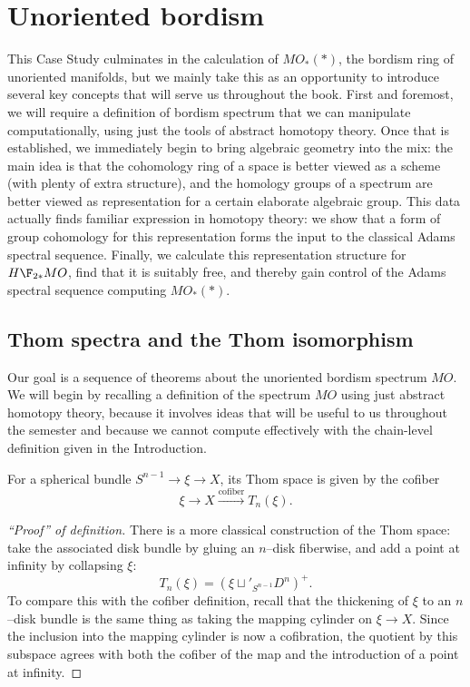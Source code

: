 
\chapter{Unoriented bordism}\label{UnorientedBordismChapter}




This Case Study culminates in the calculation of $MO_*(*)$, the bordism ring of unoriented manifolds, but we mainly take this as an opportunity to introduce several key concepts that will serve us throughout the book.  First and foremost, we will require a definition of bordism spectrum that we can manipulate computationally, using just the tools of abstract homotopy theory.  Once that is established, we immediately begin to bring algebraic geometry into the mix: the main idea is that the cohomology ring of a space is better viewed as a scheme (with plenty of extra structure), and the homology groups of a spectrum are better viewed as representation for a certain elaborate algebraic group.  This data actually finds familiar expression in homotopy theory: we show that a form of group cohomology for this representation forms the input to the classical Adams spectral sequence.  Finally, we calculate this representation structure for $H\F_{2*} MO$, find that it is suitably free, and thereby gain control of the Adams spectral sequence computing $MO_*(*)$.






\section{Thom spectra and the Thom isomorphism}\label{LectureThomSpectra}

Our goal is a sequence of theorems about the unoriented bordism spectrum $MO$.  We will begin by recalling a definition of the spectrum $MO$ using just abstract homotopy theory, because it involves ideas that will be useful to us throughout the semester and because we cannot compute effectively with the chain-level definition given in the Introduction.

\begin{definition}
For a spherical bundle $S^{n-1} \to \xi \to X$, its Thom space is given by the cofiber \[\xi \to X \xrightarrow{\text{cofiber}} T_n(\xi).\]
\end{definition}
\begin{proof}[``Proof'' of definition]
There is a more classical construction of the Thom space: take the associated disk bundle by gluing an $n$--disk fiberwise, and add a point at infinity by collapsing $\xi$: \[T_n(\xi) = (\xi \sqcup'_{S^{n-1}} D^n)^+.\]  To compare this with the cofiber definition, recall that the thickening of $\xi$ to an $n$--disk bundle is the same thing as taking the mapping cylinder on $\xi \to X$.  Since the inclusion into the mapping cylinder is now a cofibration, the quotient by this subspace agrees with both the cofiber of the map and the introduction of a point at infinity.
\end{proof}

